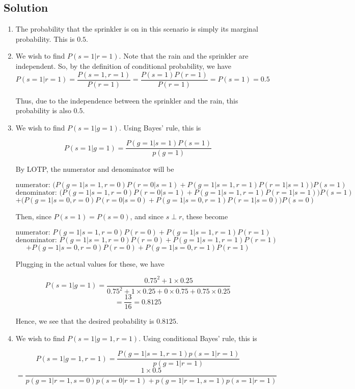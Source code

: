 \documentclass[submit]{harvardml}
\begin{document}
\subsection*{Solution}

  \begin{enumerate}
    \item The probability that the sprinkler is on in this scenario is simply its marginal probability. This is $\boxed{0.5}$.
        \item We wish to find $P(s=1|r=1)$. Note that the rain and the sprinkler are independent. So, by the definition of conditional probability, we have
        $$P(s=1|r=1) = \frac{P(s=1,r=1) }{P(r=1)} =  \frac{P(s=1)P(r=1) }{P(r=1)} = P(s=1) = 0.5 $$
        
        Thus, due to the independence between the sprinkler and the rain, this probability is also $\boxed{0.5}$.
        
    \item We wish to find $P(s=1|g=1)$. Using Bayes' rule, this is
    
    $$P(s=1|g=1) = \frac{P(g=1|s=1)P(s=1) }{p(g=1)} $$ 
    
    By LOTP, the numerator and denominator will be
    
    $$\textrm{numerator: } \big(P(g=1|s=1,r=0)P(r=0|s=1)+ P(g=1|s=1,r=1)P(r=1|s=1) \big)P(s=1) $$
    $$\textrm{denominator: } \big(P(g=1|s=1,r=0)P(r=0|s=1)+ P(g=1|s=1,r=1)P(r=1|s=1) \big)P(s=1) $$
    $$+ \big(P(g=1|s=0,r=0)P(r=0|s=0)+ P(g=1|s=0,r=1)P(r=1|s=0) \big)P(s=0) $$
    
    Then, since $P(s=1) = P(s=0)$, and since $s \perp r$, these become
    
    $$\textrm{numerator: } P(g=1|s=1,r=0)P(r=0)+ P(g=1|s=1,r=1)P(r=1) $$
    $$\textrm{denominator: } P(g=1|s=1,r=0)P(r=0)+ P(g=1|s=1,r=1)P(r=1) $$
    $$+ P(g=1|s=0,r=0)P(r=0)+ P(g=1|s=0,r=1)P(r=1)$$
    
    Plugging in the actual values for these, we have
    
    $$P(s=1|g=1) = \frac{0.75^2 + 1\times 0.25}{0.75^2 + 1\times 0.25 + 0 \times 0.75 + 0.75 \times 0.25} $$
    $$ = \frac{13}{16} = 0.8125$$
    
    Hence, we see that the desired probability is $\boxed{0.8125}$.
    
    \item We wish to find $P(s=1| g=1, r=1)$. Using conditional Bayes' rule, this is
    
    $$P(s=1| g=1, r=1) = \frac{P(g=1|s=1, r=1)p(s=1|r=1)}{p(g=1|r=1)} $$
    $$= \frac{1 \times 0.5}{p(g=1|r=1,s=0)p(s=0|r=1) + p(g=1|r=1,s=1)p(s=1|r=1) } $$
    

\end{enumerate}
\end{document}
